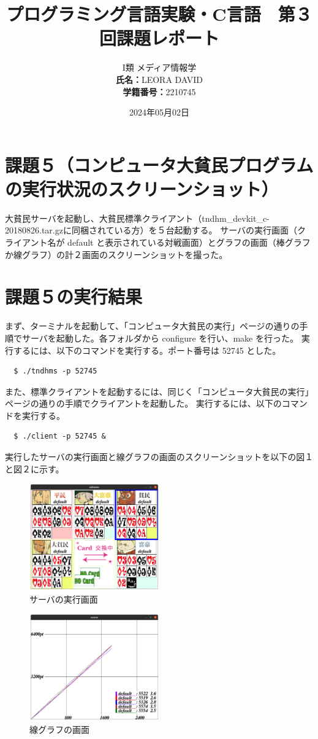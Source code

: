 \documentclass[]{jsarticle}
\title{\vspace{-3cm} プログラミング言語実験・C言語　第３回課題レポート}
\author{I類 メディア情報学 \\\textbf{氏名：}LEORA DAVID\\\textbf{学籍番号：}2210745}
\date{2024年05月02日}
\begin{document}
\maketitle

\section*{課題５（コンピュータ大貧民プログラムの実行状況のスクリーンショット）}
大貧民サーバを起動し、大貧民標準クライアント（tndhm\_devkit\_c-20180826.tar.gzに同梱されている方）を５台起動する。
サーバの実行画面（クライアント名が default と表示されている対戦画面）とグラフの画面（棒グラフか線グラフ）の計２画面のスクリーンショットを撮った。\\

\section*{課題５の実行結果}
まず、ターミナルを起動して、「コンピュータ大貧民の実行」ページの通りの手順でサーバを起動した。各フォルダから configure を行い、make を行った。
実行するには、以下のコマンドを実行する。ポート番号は 52745 とした。
\begin{lstlisting}
  $ ./tndhms -p 52745
\end{lstlisting}

また、標準クライアントを起動するには、同じく「コンピュータ大貧民の実行」ページの通りの手順でクライアントを起動した。
実行するには、以下のコマンドを実行する。
\begin{lstlisting}
  $ ./client -p 52745 &
\end{lstlisting}

実行したサーバの実行画面と線グラフの画面のスクリーンショットを以下の図１と図２に示す。
\begin{figure}[h]
  \centering
  \includegraphics[width=0.5\textwidth]{kadai5/1.png}
  \caption{サーバの実行画面}
\end{figure}

\begin{figure}[h]
  \centering
  \includegraphics[width=0.5\textwidth]{kadai5/2.png}
  \caption{線グラフの画面}
\end{figure}
\end{document}
